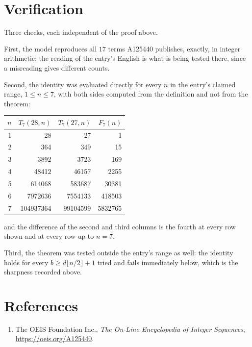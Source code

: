 \documentclass[11pt,a4paper]{article}
\theoremstyle{plain}
\theoremstyle{definition}
\begin{document}
\section{Verification}

Three checks, each independent of the proof above.

First, the model reproduces all $17$ terms A125440 publishes, exactly, in integer
arithmetic; the reading of the entry's English is what is being tested there, since a
misreading gives different counts.

Second, the identity was evaluated directly for every $n$ in the entry's claimed range,
$1\le n\le7$, with both sides computed from the definition and not from the theorem:

\begin{center}
\begin{tabular}{rrrr}
$n$ & $T_{7}(28,n)$ & $T_{7}(27,n)$ & $F_{7}(n)$ \\ \hline
1 & 28 & 27 & 1 \\
2 & 364 & 349 & 15 \\
3 & 3892 & 3723 & 169 \\
4 & 48412 & 46157 & 2255 \\
5 & 614068 & 583687 & 30381 \\
6 & 7972636 & 7554133 & 418503 \\
7 & 104937364 & 99104599 & 5832765 \\
\end{tabular}
\end{center}

\noindent and the difference of the second and third columns is the fourth at every row shown
and at every row up to $n=7$.

Third, the theorem was tested outside the entry's range as well: the identity holds for every
$b\ge d\lfloor n/2\rfloor+1$ tried and fails immediately below, which is the sharpness recorded
above.

\section*{References}
\begin{enumerate}
\item The OEIS Foundation Inc., \emph{The On-Line Encyclopedia of Integer Sequences},
\url{https://oeis.org/A125440}.
\end{enumerate}
\end{document}
